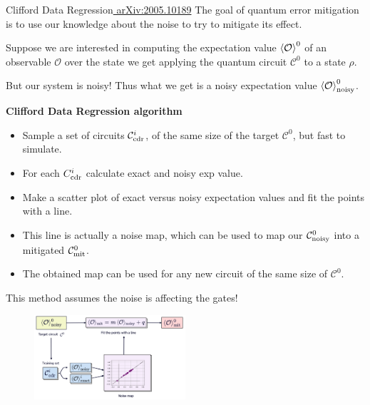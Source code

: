 \documentclass[aspectratio=169, 8pt, xcolor={svgnames}, hyperref={linkcolor=black}]{beamer}
\begin{document}
\begin{frame}{Clifford Data Regression\hfill \href{https://arxiv.org/abs/2005.10189}{\faBook\,\,arXiv:2005.10189}}
\textcolor{carnelian}{The goal of quantum error mitigation is to use our knowledge about 
the noise to try to mitigate its effect.} \pause

Suppose we are interested in computing the expectation value $\braket{\mathcal{O}}^0$ 
of an observable $\mathcal{O}$
over the state we get applying the quantum circuit $\mathcal{C}^0$ to a state $\rho$. \pause

But our system is noisy! Thus what we get is a noisy expectation value $\braket{\mathcal{O}}^0_{\rm noisy}$. \pause

\begin{multicols}{2}
\textbf{Clifford Data Regression algorithm}
\begin{itemize}[noitemsep]
\item[1.] Sample a set of circuits $\mathcal{C}^i_{\rm cdr}$, of the 
same size of the target $\mathcal{C}^0$, but fast to simulate.
\item[2.] For each $C^i_{\rm cdr}$ calculate exact and noisy exp value.
\item[3.] Make a scatter plot of exact versus noisy expectation values and fit 
the points with a line.
\item[4.] This line is actually a noise map, which can be used to map our $\mathcal{C}^0_{\rm noisy}$
into a mitigated $\mathcal{C}^0_{\rm mit}$.
\item[5.] The obtained map can be used for any new circuit of the same size of $\mathcal{C}^0$.
\end{itemize}
\textcolor{carnelian}{This method assumes the noise is affecting the gates!}
\begin{figure}
    \includegraphics[width=0.5\textwidth]{figures/cdr.png}
\end{figure}
\end{multicols}

\end{frame}
\end{document}
